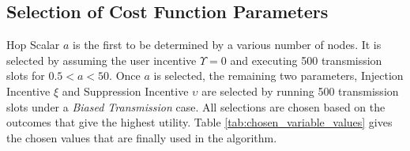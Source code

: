 \documentclass[journal]{IEEEtran}  %
\begin{document}


\subsection{Selection of Cost Function Parameters}
Hop Scalar $a$ is the first to be determined by a various number of nodes.
It is selected by assuming the user incentive $\Upsilon=0$ and executing 500
transmission slots  
 for $0.5 < a < 50$. 
Once $a$ is selected, the remaining two parameters, Injection Incentive
$\xi$ and Suppression Incentive $\upsilon$ are selected by running 500
transmission slots under a \textit{Biased Transmission} case.
All selections are chosen based on the outcomes that give the highest utility.
Table \ref{tab:chosen_variable_values} gives the chosen values that are finally
used in the algorithm.
\end{document}
